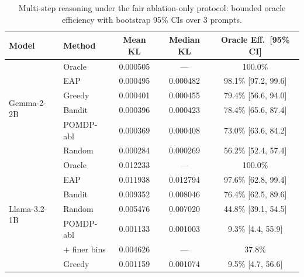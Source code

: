 \begin{table}[H]
\centering
\caption{Multi-step reasoning under the fair ablation-only protocol:
bounded oracle efficiency with bootstrap 95\% CIs over 3 prompts.}
\label{tab:multistep}
{\small
\begin{tabular}{llccc}
\toprule
\textbf{Model} & \textbf{Method} & \textbf{Mean KL} & \textbf{Median KL} & \textbf{Oracle Eff.\ [95\% CI]} \\
\midrule
\multirow{6}{*}{Gemma-2-2B}
 & Oracle    & 0.000505 & ---      & 100.0\% \\
 & EAP       & 0.000495 & 0.000482 & 98.1\% [97.2, 99.6] \\
 & Greedy    & 0.000401 & 0.000455 & 79.4\% [56.6, 94.0] \\
 & Bandit    & 0.000396 & 0.000423 & 78.4\% [65.6, 87.4] \\
 & POMDP-abl & 0.000369 & 0.000408 & 73.0\% [63.6, 84.2] \\
 & Random    & 0.000284 & 0.000269 & 56.2\% [52.4, 57.4] \\
\midrule
\multirow{7}{*}{Llama-3.2-1B}
 & Oracle    & 0.012233 & ---      & 100.0\% \\
 & EAP       & 0.011938 & 0.012794 & 97.6\% [62.8, 99.4] \\
 & Bandit    & 0.009352 & 0.008046 & 76.4\% [62.5, 89.6] \\
 & Random    & 0.005476 & 0.007020 & 44.8\% [39.1, 54.5] \\
 & POMDP-abl & 0.001133 & 0.001003 & 9.3\% [4.4, 55.9] \\
 & \;+ finer bins & 0.004626 & --- & 37.8\% \\
 & Greedy    & 0.001159 & 0.001074 & 9.5\% [4.7, 56.6] \\
\bottomrule
\end{tabular}%
}
\end{table}

